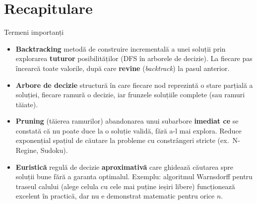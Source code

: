 ﻿\documentclass[10pt]{beamer}
\begin{document}
\section{Recapitulare}

\begin{frame}{Termeni importanți}
  \begin{itemize}\itemsep5pt
    \item \textbf{Backtracking} \textemdash{} metodă de construire incrementală a
      unei soluții prin explorarea \textbf{tuturor} posibilităților (DFS în
      arborele de decizie). La fiecare pas încearcă toate valorile, după care
      \textbf{revine} (\textit{backtrack}) la pasul anterior.

    \item \textbf{Arbore de decizie} \textemdash{} structură în care fiecare nod
      reprezintă o stare parțială a soluției, fiecare ramură o decizie, iar
      frunzele soluțiile complete (sau ramuri tăiate).

    \item \textbf{Pruning} (tăierea ramurilor) \textemdash{} abandonarea unui subarbore
      \textbf{imediat ce} se constată că nu poate duce la o soluție validă, fără
      a-l mai explora. Reduce exponențial spațiul de căutare la probleme cu
      constrângeri stricte (ex.\ N-Regine, Sudoku).

    \item \textbf{Euristică} \textemdash{} regulă de decizie \textbf{aproximativă}
      care ghidează căutarea spre soluții bune fără a garanta optimalul.
      Exemplu: algoritmul Warnsdorff pentru traseul calului (alege celula cu
      cele mai puține ieșiri libere) \textemdash{} funcționează excelent în
      practică, dar nu e demonstrat matematic pentru orice $n$.
  \end{itemize}
\end{frame}
\end{document}
